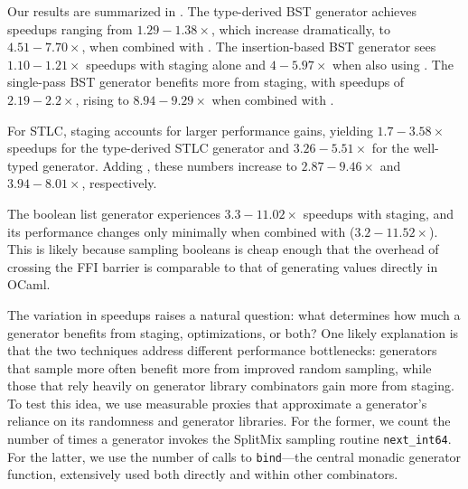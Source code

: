 \documentclass[acmsmall]{acmart}
\theoremstyle{definition}
\begin{document}
Our results are summarized in .
The type-derived \camlname BST generator achieves speedups ranging from $1.29-1.38\times$, which increase
dramatically, to $4.51-7.70\times$, when combined with \csplitmix. The insertion-based BST generator sees
$1.10-1.21\times$ speedups with staging alone and $4-5.97\times$ when also
using \csplitmix. The single-pass BST generator benefits more from
staging, with speedups of $2.19-2.2\times$, rising to $8.94-9.29\times$ when combined with
\csplitmix.


For STLC, staging accounts for larger performance gains, yielding
$1.7-3.58\times$ speedups for the type-derived STLC generator and $3.26-5.51\times$ for
the well-typed generator. Adding \csplitmix, these numbers increase to
$2.87-9.46\times$ and $3.94-8.01\times$, respectively.


The boolean list generator experiences $3.3-11.02\times$ speedups with
staging, and its performance changes only minimally when
combined with \csplitmix ($3.2-11.52\times$). This is likely because sampling
booleans is cheap enough that the overhead of crossing the FFI barrier is
comparable to that of generating values directly in OCaml.

The variation in speedups raises a natural question: what
determines how much a generator benefits from staging, \rand optimizations, or both?
One likely explanation is that the two techniques address different performance bottlenecks:
generators that sample more often benefit more from improved random sampling, while those that rely
heavily on generator library combinators gain more from staging.
To test this idea, we use measurable proxies that approximate a generator's reliance on its randomness and generator libraries.
For the former, we count the number of times a generator invokes the SplitMix sampling routine \texttt{next\_int64}.
For the latter, we use the number of calls to \texttt{bind}---the central monadic generator function, extensively used both directly and within other combinators.
\end{document}
